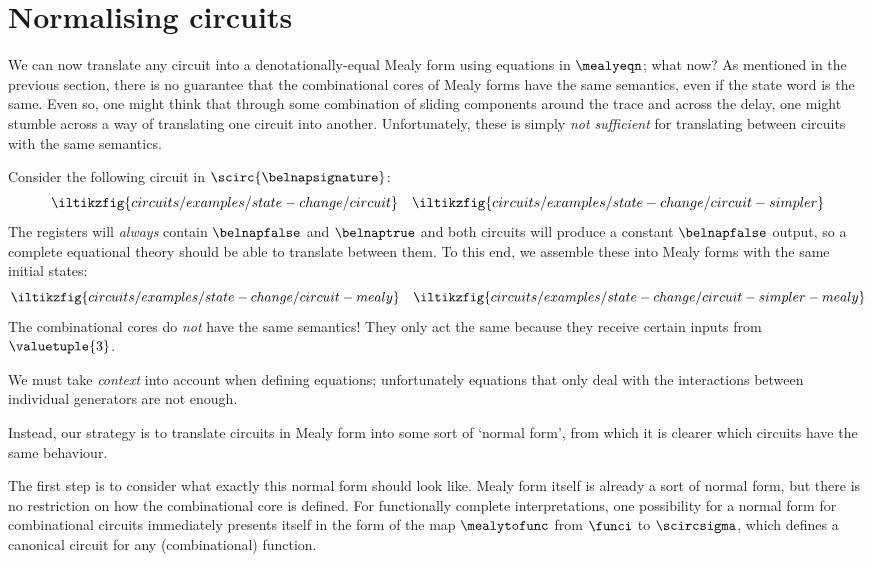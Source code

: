 \section{Normalising circuits}

We can now translate any circuit into a denotationally-equal Mealy form using
equations in \(\mealyeqn\); what now?
As mentioned in the previous section, there is no guarantee that the
combinational cores of Mealy forms have the same semantics, even if the state
word is the same.
Even so, one might think that through some combination of sliding components
around the trace and across the delay, one might stumble across a way of
translating one circuit into another.
Unfortunately, these is simply \emph{not sufficient} for
translating between circuits with the same semantics.

\begin{example}
    Consider the following circuit in \(\scirc{\belnapsignature}\): \[
        \iltikzfig{circuits/examples/state-change/circuit}
        \quad
        \iltikzfig{circuits/examples/state-change/circuit-simpler}
    \]
    The registers will \emph{always} contain
    \(\belnapfalse\) and \(\belnaptrue\) and both circuits will
    produce a constant \(\belnapfalse\) output, so a complete equational theory
    should be able to translate between them.
    To this end, we assemble these into Mealy forms with the same initial states:
    \[
        \iltikzfig{circuits/examples/state-change/circuit-mealy}
        \quad
        \iltikzfig{circuits/examples/state-change/circuit-simpler-mealy}
    \]
    The combinational cores do \emph{not} have the same semantics!
    They only act the same because they receive certain inputs
    from \(\valuetuple{3}\).
\end{example}

We must take \emph{context} into account when defining
equations; unfortunately equations that only deal with the interactions between
individual generators are not enough.

Instead, our strategy is to translate circuits in Mealy form into some sort of
`normal form', from which it is clearer which circuits have the same behaviour.


The first step is to consider what exactly this normal form should look like.
Mealy form itself is already a sort of normal form, but there is no restriction
on how the combinational core is defined.
For functionally complete interpretations, one possibility for a normal form
for combinational circuits immediately presents itself in the form of the map
\(\mealytofunc\) from \(\funci\) to \(\scircsigma\), which defines a canonical
circuit for any (combinational) function.

